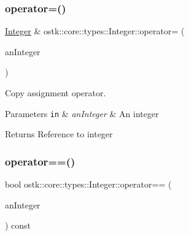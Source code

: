 \mbox{\label{classostk_1_1core_1_1types_1_1_integer_a2c5e55747841b6810a8769acbbc9393e}} 
\subsubsection{\texorpdfstring{operator=()}{operator=()}}
{\footnotesize\ttfamily \hyperlink{classostk_1_1core_1_1types_1_1_integer}{Integer} \& ostk\+::core\+::types\+::\+Integer\+::operator= (\begin{DoxyParamCaption}\item[{\hyperlink{classostk_1_1core_1_1types_1_1_integer_a76a5f41f78659f116eafaf26cecc3244}{Integer\+::\+Value\+Type}}]{an\+Integer }\end{DoxyParamCaption})}



Copy assignment operator. 


\begin{DoxyParams}[1]{Parameters}
\mbox{\tt in}  & {\em an\+Integer} & An integer \\
\hline
\end{DoxyParams}
\begin{DoxyReturn}{Returns}
Reference to integer 
\end{DoxyReturn}
\mbox{\label{classostk_1_1core_1_1types_1_1_integer_af00416fe28c7d4aec55bd45c031fdb41}} 
\subsubsection{\texorpdfstring{operator==()}{operator==()}\hspace{0.1cm}{\footnotesize\ttfamily [1/2]}}
{\footnotesize\ttfamily bool ostk\+::core\+::types\+::\+Integer\+::operator== (\begin{DoxyParamCaption}\item[{const \hyperlink{classostk_1_1core_1_1types_1_1_integer}{Integer} \&}]{an\+Integer }\end{DoxyParamCaption}) const}




